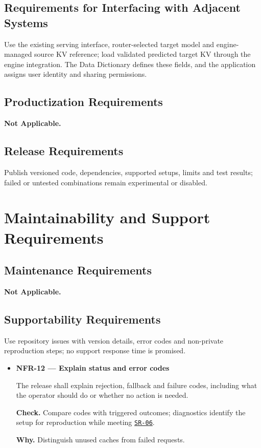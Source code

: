 \documentclass[12pt]{article}
\begin{document}
\subsection{Requirements for Interfacing with Adjacent Systems}
Use the existing serving interface, router-selected target model and
engine-managed source KV reference; load validated predicted target KV through
the engine integration. The Data Dictionary defines these fields, and the
application assigns user identity and sharing permissions.


\subsection{Productization Requirements}
\textbf{Not Applicable.}


\subsection{Release Requirements}
Publish versioned code, dependencies, supported setups, limits and test
results; failed or untested combinations remain experimental or disabled.


\section{Maintainability and Support Requirements}


\subsection{Maintenance Requirements}
\textbf{Not Applicable.}


\subsection{Supportability Requirements}
Use repository issues with version details, error codes and non-private reproduction steps; no support response time is promised.

\begin{itemize}
\item {}\label{req:NFR-12}
\textbf{NFR-12 --- Explain status and error codes}\par
The release shall explain rejection, fallback and failure codes, including what the operator should do or whether no action is needed.\par
\textbf{Check.} Compare codes with triggered outcomes; diagnostics identify the setup for reproduction while meeting \hyperref[req:SR-06]{\texttt{SR-06}}.\par
\textbf{Why.} Distinguish unused caches from failed requests.
\end{itemize}
\end{document}
